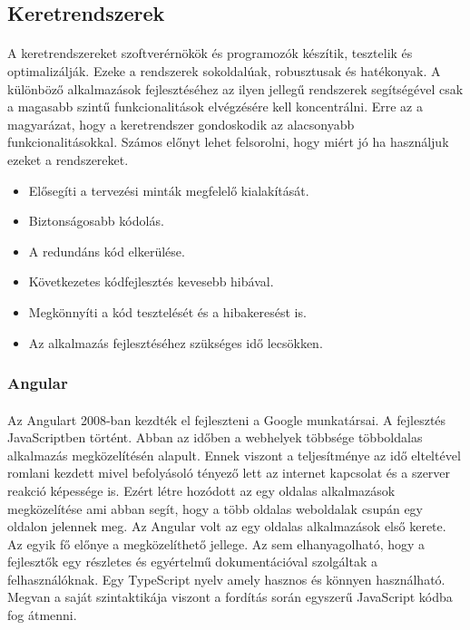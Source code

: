 \documentclass{article}
\begin{document}
	\subsection{Keretrendszerek}
	\paragraph{}
	A keretrendszereket szoftverérnökök és programozók készítik, tesztelik és optimalizálják. Ezeke a rendszerek sokoldalúak, robusztusak és hatékonyak. A különböző alkalmazások fejlesztéséhez az ilyen jellegű rendszerek segítségével csak a magasabb szintű funkcionalitások elvégzésére kell koncentrálni. Erre az a magyarázat, hogy a keretrendszer gondoskodik az alacsonyabb funkcionalitásokkal. Számos előnyt lehet felsorolni, hogy miért jó ha használjuk ezeket a rendszereket.\cite{frameworks}
	\begin{itemize}
		\item Elősegíti a tervezési minták megfelelő kialakítását.
		\item Biztonságosabb kódolás.
		\item A redundáns kód elkerülése.
		\item Következetes kódfejlesztés kevesebb hibával.
		\item Megkönnyíti a kód tesztelését és a hibakeresést is.
		\item Az alkalmazás fejlesztéséhez szükséges idő lecsökken.
	\end{itemize}

	\subsubsection{Angular}
	\paragraph{}
	Az Angulart 2008-ban kezdték el fejleszteni a Google munkatársai. A fejlesztés JavaScriptben történt. Abban az időben a webhelyek többsége többoldalas alkalmazás megközelítésén alapult. Ennek viszont a teljesítménye az idő elteltével romlani kezdett mivel befolyásoló tényező lett az internet kapcsolat és a szerver reakció képessége is. Ezért létre hozódott az egy oldalas alkalmazások megközelítése ami abban segít, hogy a több oldalas weboldalak csupán egy oldalon jelennek meg. Az Angular volt az egy oldalas alkalmazások első kerete. Az egyik fő előnye a megközelíthető jellege. Az sem elhanyagolható, hogy a fejlesztők egy részletes és egyértelmű dokumentációval szolgáltak a felhasználóknak. Egy TypeScript nyelv amely hasznos és könnyen használható. Megvan a saját szintaktikája viszont a fordítás során egyszerű JavaScript kódba fog átmenni.\cite{wohlgethan2018supportingweb}
	
\end{document}
